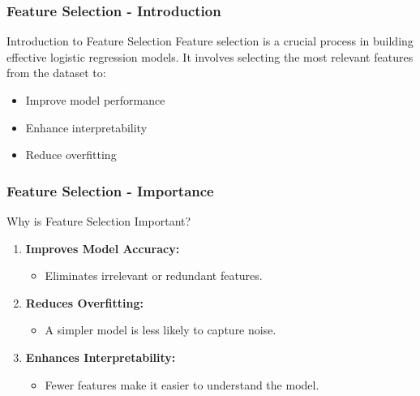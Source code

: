 \documentclass[aspectratio=169]{beamer}
\begin{document}
\begin{frame}[fragile]
  \frametitle{Feature Selection - Introduction}
  \begin{block}{Introduction to Feature Selection}
    Feature selection is a crucial process in building effective logistic regression models. It involves selecting the most relevant features from the dataset to:
    \begin{itemize}
        \item Improve model performance
        \item Enhance interpretability
        \item Reduce overfitting
    \end{itemize}
  \end{block}
\end{frame}

\begin{frame}[fragile]
  \frametitle{Feature Selection - Importance}
  \begin{block}{Why is Feature Selection Important?}
    \begin{enumerate}
      \item \textbf{Improves Model Accuracy:} 
      \begin{itemize}
          \item Eliminates irrelevant or redundant features.
      \end{itemize}
      \item \textbf{Reduces Overfitting:} 
      \begin{itemize}
          \item A simpler model is less likely to capture noise.
      \end{itemize}
      \item \textbf{Enhances Interpretability:} 
      \begin{itemize}
          \item Fewer features make it easier to understand the model.
      \end{itemize}
    \end{enumerate}
  \end{block}
\end{frame}
\end{document}
